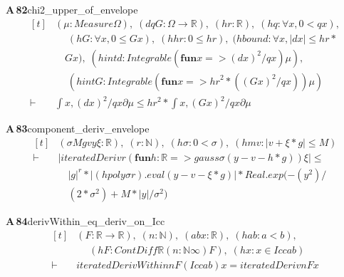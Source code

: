 \documentclass[conference]{IEEEtran}
\theoremstyle{definition}
\newcommand{\lean}[1]{\textsf{\footnotesize #1}}
\begin{document}
\noindent\textbf{A\,82}\quad\lean{chi2\_upper\_of\_envelope}
{\footnotesize\[ \begin{aligned}[t]
&(\mu : \mathit{Measure} \Omega ),\; (\mathit{d} \mathit{q} \mathit{G} : \Omega \to \mathbb{R} ),\; (\mathit{hr} : \mathbb{R} ),\; (\mathit{hq} : \forall \mathit{x}, 0 < \mathit{q} \mathit{x}),\\
&\quad \; (\mathit{hG} : \forall \mathit{x}, 0 \leq \mathit{G} \mathit{x}),\; (\mathit{hhr} : 0 \leq \mathit{hr}),\; (\mathit{hbound} : \forall \mathit{x}, |\mathit{d} \mathit{x}| \leq \mathit{hr} *\\
&\quad \mathit{G} \mathit{x}),\; (\mathit{hintd} : \mathit{Integrable} (\mathbf{fun} \mathit{x} => (\mathit{d} \mathit{x}) ^{2} / \mathit{q} \mathit{x}) \mu ),\\
&\quad \; (\mathit{hintG} : \mathit{Integrable} (\mathbf{fun} \mathit{x} => \mathit{hr} ^{2} * ((\mathit{G} \mathit{x}) ^{2} / \mathit{q} \mathit{x})) \mu )\\
\vdash\;&\int \mathit{x}, (\mathit{d} \mathit{x}) ^{2} / \mathit{q} \mathit{x} ∂\mu \leq \mathit{hr} ^{2} * \int \mathit{x}, (\mathit{G} \mathit{x}) ^{2} / \mathit{q} \mathit{x} ∂\mu
\end{aligned} \]}

\noindent\textbf{A\,83}\quad\lean{component\_deriv\_envelope}
{\footnotesize\[ \begin{aligned}[t]
&(\sigma \mathit{M} \mathit{g} \mathit{v} \mathit{y} \xi : \mathbb{R} ),\; (\mathit{r} : \mathbb{N} ),\; (\mathit{hσ} : 0 < \sigma ),\; (\mathit{hmv} : |\mathit{v} + \xi * \mathit{g}| \leq \mathit{M})\\
\vdash\;&|\mathit{iteratedDeriv} \mathit{r} (\mathbf{fun} \mathit{h} : \mathbb{R} => \mathit{gauss} \sigma (\mathit{y} - \mathit{v} - \mathit{h} * \mathit{g})) \xi | \leq\\
&\quad |\mathit{g}| ^{\mathit{r}} * |(\mathit{hpoly} \sigma \mathit{r}).\mathit{eval} (\mathit{y} - \mathit{v} - \xi * \mathit{g})| * \mathit{Real}.\mathit{exp} (-(\mathit{y} ^{2}) /\\
&\quad (2 * \sigma ^{2}) + \mathit{M} * |\mathit{y}| / \sigma ^{2})
\end{aligned} \]}

\noindent\textbf{A\,84}\quad\lean{derivWithin\_eq\_deriv\_on\_Icc}
{\footnotesize\[ \begin{aligned}[t]
&(\mathit{F} : \mathbb{R} \to \mathbb{R} ),\; (\mathit{n} : \mathbb{N} ),\; (\mathit{a} \mathit{b} \mathit{x} : \mathbb{R} ),\; (\mathit{hab} : \mathit{a} < \mathit{b}),\\
&\quad \; (\mathit{hF} : \mathit{ContDiff} \mathbb{R} (\mathit{n} : \mathbb{N} \infty ) \mathit{F}),\; (\mathit{hx} : \mathit{x} \in \mathit{Icc} \mathit{a} \mathit{b})\\
\vdash\;&\mathit{iteratedDerivWithin} \mathit{n} \mathit{F} (\mathit{Icc} \mathit{a} \mathit{b}) \mathit{x} = \mathit{iteratedDeriv} \mathit{n} \mathit{F} \mathit{x}
\end{aligned} \]}
\end{document}
